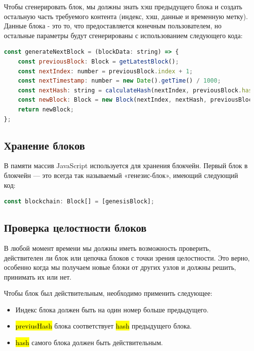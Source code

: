 \documentclass{article}
\begin{document}
Чтобы сгенерировать блок, мы должны знать хэш предыдущего блока и создать остальную часть требуемого контента (индекс, хэш, данные и временную метку). Данные блока - это то, что предоставляется конечным пользователем, но остальные параметры будут сгенерированы с использованием следующего кода:


\begin{lstlisting}[language=JavaScript, caption={Генерация блока}]
const generateNextBlock = (blockData: string) => {
	const previousBlock: Block = getLatestBlock();
	const nextIndex: number = previousBlock.index + 1;
	const nextTimestamp: number = new Date().getTime() / 1000;
	const nextHash: string = calculateHash(nextIndex, previousBlock.hash, nextTimestamp, blockData);
	const newBlock: Block = new Block(nextIndex, nextHash, previousBlock.hash, nextTimestamp, blockData);
	return newBlock;
};
\end{lstlisting}

\subsection{Хранение блоков}

В памяти массив JavaScript используется для хранения блокчейн. Первый блок в блокчейн — это всегда так называемый «генезис-блок», имеющий следующий код:

\begin{lstlisting}[language=JavaScript, caption={Хранение блоков}]
const blockchain: Block[] = [genesisBlock];
\end{lstlisting}


\subsection{Проверка целостности блоков}

В любой момент времени мы должны иметь возможность проверить, действителен ли блок или цепочка блоков с точки зрения целостности. Это верно, особенно когда мы получаем новые блоки от других узлов и должны решить, принимать их или нет.

Чтобы блок был действительным, необходимо применить следующее:

\begin{itemize}
	\item Индекс блока должен быть на один номер больше предыдущего.
	\item \hl{previusHash} блока соответствует \hl{hash} предыдущего блока.
	\item \hl{hash} самого блока должен быть действительным.
\end{itemize}
\end{document}
